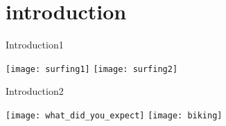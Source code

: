 \section{introduction}

\begin{frame}{Introduction1}

\begin{center}
\texttt{[image: surfing1]}
\texttt{[image: surfing2]}
\end{center}

\end{frame}

\begin{frame}{Introduction2}

\begin{center}
\texttt{[image: what\_did\_you\_expect]}
\texttt{[image: biking]}
\end{center}

\end{frame}
